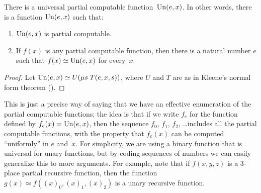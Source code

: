 \documentclass[../../../include/open-logic-section]{subfiles}
\begin{document}

\begin{thm}
There is a universal partial computable function~$\mathrm{Un}(e,x)$. In other
words, there is a function $\mathrm{Un}(e,x)$ such that:
\begin{enumerate}
\item $\mathrm{Un}(e,x)$ is partial computable.
\item If $f(x)$ is any partial computable function, then there is a
natural number $e$ such that $f(x) \simeq \mathrm{Un}(e,x)$ for every~$x$.
\end{enumerate}
\end{thm}

\begin{proof}
Let $\mathrm{Un}(e,x) \simeq U(\mu s \; T(e,x,s))$, where $U$ and $T$ are
as in Kleene's normal form theorem ().
\end{proof}

\begin{explain}
This is just a precise way of saying that we have an effective
enumeration of the partial computable functions; the idea is that if
we write $f_e$ for the function defined by $f_e(x) = \mathrm{Un}(e,x)$,
then the sequence $f_0$, $f_1$, $f_2$, \dots includes all the partial
computable functions, with the property that $f_e(x)$ can be computed
``uniformly'' in $e$ and~$x$. For simplicity, we are using a binary
function that is universal for unary functions, but by coding
sequences of numbers we can easily generalize this to more arguments.
For example, note that if $f(x,y,z)$ is a $3$-place partial recursive
function, then the function $g(x) \simeq f((x)_0, (x)_1, (x)_2)$ is a
unary recursive function.
\end{explain}
\end{document}
